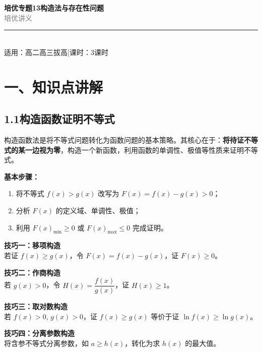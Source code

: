 \documentclass[12pt, a4paper]{ctexart}
\begin{document}
\begin{center}
{\Huge\bfseries\textcolor{mainblue}{培优专题13\quad 构造法与存在性问题}}\\[12pt]
{\Large\textcolor{gray}{培\quad 优\quad 讲\quad 义}}\\[8pt]
\rule{0.6\textwidth}{1pt}\\[8pt]
{\normalsize 适用：高二高三拔高\quad |\quad 课时：3课时}
\end{center}
\vspace{10pt}

\section*{\textcolor{mainblue}{一、知识点讲解}}

\subsection*{1.1\quad 构造函数证明不等式}

\begin{knowledgebox}[核心思想]
构造函数法是将不等式问题转化为函数问题的基本策略。其核心在于：\textbf{将待证不等式的某一边视为零}，构造一个新函数，利用函数的单调性、极值等性质来证明不等式。

\medskip
\textbf{基本步骤：}
\begin{enumerate}[label=(\arabic*)]
  \item 将不等式 $f(x) > g(x)$ 改写为 $F(x) = f(x) - g(x) > 0$；
  \item 分析 $F(x)$ 的定义域、单调性、极值；
  \item 利用 $F(x)_{\min} \geq 0$ 或 $F(x)_{\max} \leq 0$ 完成证明。
\end{enumerate}
\end{knowledgebox}

\begin{tipbox}[常用构造技巧]
\textbf{技巧一：移项构造}\\
若证 $f(x) \geq g(x)$，令 $F(x) = f(x) - g(x)$，证 $F(x) \geq 0$。

\medskip
\textbf{技巧二：作商构造}\\
若 $g(x) > 0$，令 $H(x) = \dfrac{f(x)}{g(x)}$，证 $H(x) \geq 1$。

\medskip
\textbf{技巧三：取对数构造}\\
若 $f(x) > 0,\, g(x) > 0$，证 $f(x) \geq g(x)$ 等价于证 $\ln f(x) \geq \ln g(x)$。

\medskip
\textbf{技巧四：分离参数构造}\\
将含参不等式分离参数，如 $a \geq h(x)$，转化为求 $h(x)$ 的最大值。
\end{tipbox}
\end{document}
